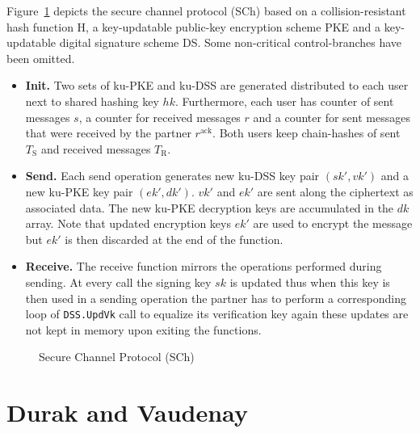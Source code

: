 \documentclass[11pt,a4paper,twoside,openright,bibliography=totoc]{scrbook}
\renewcommand{\t}{\text} %
\begin{document}
Figure~\ref{fig:secure-channel} depicts the secure channel
protocol (SCh) based on a collision-resistant
hash function H, a key-updatable public-key encryption scheme PKE and
a key-updatable digital signature scheme DS. Some non-critical
control-branches have been omitted.
\begin{itemize}
\item \textbf{Init.} Two sets of ku-PKE and ku-DSS are generated
  distributed to each user next to shared hashing key $hk$. Furthermore,
  each user has counter of sent messages $s$, a counter for received messages
  $r$ and a counter for sent messages that were received by the partner
  $r^\t{ack}$. Both users keep chain-hashes of sent $T_\t{S}$ and received
  messages $T_\t{R}$.
\item \textbf{Send.} Each send operation generates new ku-DSS key pair
  $(sk',vk')$ and a new ku-PKE key pair $(ek',dk')$. $vk'$ and $ek'$ are sent
  along the ciphertext as associated data. The new ku-PKE decryption keys are accumulated
  in the $dk$ array. Note that updated encryption keys $ek'$ are used to
  encrypt the message but $ek'$ is then discarded at the end of the function.
\item \textbf{Receive.} The receive function mirrors the operations
  performed during sending. At every call the signing key $sk$ is updated
  thus when this key is then used in a sending operation the
  partner has to perform a corresponding loop of \texttt{DSS.UpdVk}
  call to equalize its verification key again these updates
  are not kept in memory upon exiting the functions.
\end{itemize}

\begin{figure}[p]
  \centering
  \setlength{\fboxsep}{10pt}
  \scalebox{0.9}{%
    \fbox{%
      
    }
  }
  \caption{Secure Channel Protocol (SCh)}
  \label{fig:secure-channel}
\end{figure}

\clearpage

\section[Durak and Vaudenay]
{Durak and Vaudenay~\cite{durak2018bidirectional}}
\label{sec:durak-vaudenay}
\end{document}
